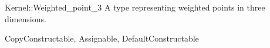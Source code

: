 \begin{ccRefConcept}{Kernel::Weighted_point_3}
A type representing weighted points in three dimensions.

\ccRefines
CopyConstructable, Assignable, DefaultConstructable

\ccSeeAlso
{} \\
 \\
 \\
 \\

\end{ccRefConcept}
